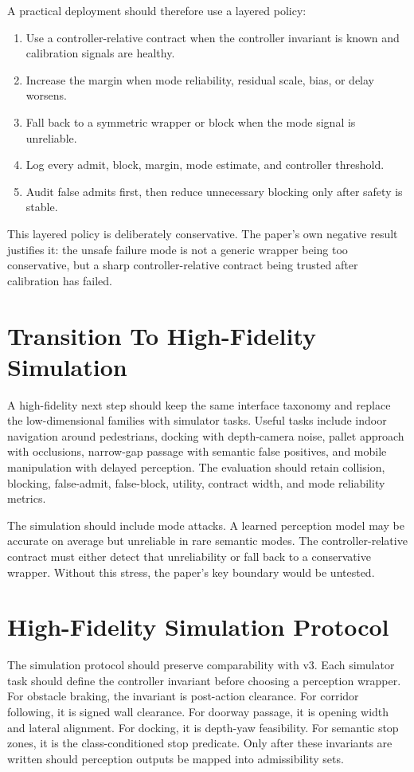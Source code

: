 \documentclass{article}
\begin{document}
A practical deployment should therefore use a layered policy:
\begin{enumerate}
    \item Use a controller-relative contract when the controller invariant is known and calibration signals are healthy.
    \item Increase the margin when mode reliability, residual scale, bias, or delay worsens.
    \item Fall back to a symmetric wrapper or block when the mode signal is unreliable.
    \item Log every admit, block, margin, mode estimate, and controller threshold.
    \item Audit false admits first, then reduce unnecessary blocking only after safety is stable.
\end{enumerate}

This layered policy is deliberately conservative. The paper's own negative result justifies it: the unsafe failure mode is not a generic wrapper being too conservative, but a sharp controller-relative contract being trusted after calibration has failed.

\clearpage
\section{Transition To High-Fidelity Simulation}

A high-fidelity next step should keep the same interface taxonomy and replace the low-dimensional families with simulator tasks. Useful tasks include indoor navigation around pedestrians, docking with depth-camera noise, pallet approach with occlusions, narrow-gap passage with semantic false positives, and mobile manipulation with delayed perception. The evaluation should retain collision, blocking, false-admit, false-block, utility, contract width, and mode reliability metrics.

The simulation should include mode attacks. A learned perception model may be accurate on average but unreliable in rare semantic modes. The controller-relative contract must either detect that unreliability or fall back to a conservative wrapper. Without this stress, the paper's key boundary would be untested.

\section{High-Fidelity Simulation Protocol}

The simulation protocol should preserve comparability with v3. Each simulator task should define the controller invariant before choosing a perception wrapper. For obstacle braking, the invariant is post-action clearance. For corridor following, it is signed wall clearance. For doorway passage, it is opening width and lateral alignment. For docking, it is depth-yaw feasibility. For semantic stop zones, it is the class-conditioned stop predicate. Only after these invariants are written should perception outputs be mapped into admissibility sets.
\end{document}
